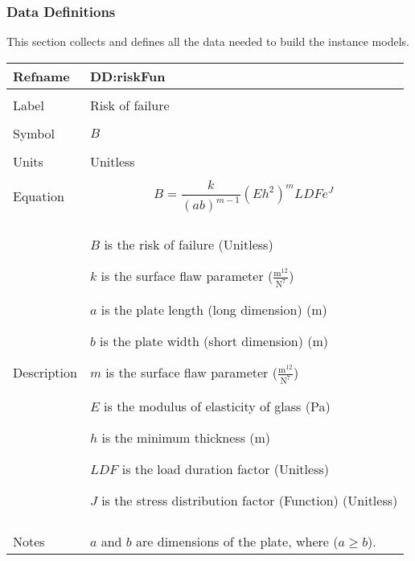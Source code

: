 \documentclass[12pt]{article}
\begin{document}
\subsubsection{Data Definitions}
\label{Sec:DDs}
This section collects and defines all the data needed to build the instance models.

\vspace{\baselineskip}
\noindent
\begin{minipage}{\textwidth}
\begin{tabular}{>{\raggedright}p{}>{\raggedright\arraybackslash}p{}}
\toprule \textbf{Refname} & \textbf{DD:riskFun}
\label{DD:riskFun}
\\ \midrule \\
Label & Risk of failure
        
\\ \midrule \\
Symbol & $B$
         
\\ \midrule \\
Units & Unitless
        
\\ \midrule \\
Equation & \begin{displaymath}
           B=\frac{k}{\left(a b\right)^{m-1}} \left(E h^{2}\right)^{m} LDF e^{J}
           \end{displaymath}
\\ \midrule \\
Description & \begin{symbDescription}
              \item{$B$ is the risk of failure (Unitless)}
              \item{$k$ is the surface flaw parameter ($\frac{\text{m}^{12}}{\text{N}^{7}}$)}
              \item{$a$ is the plate length (long dimension) (m)}
              \item{$b$ is the plate width (short dimension) (m)}
              \item{$m$ is the surface flaw parameter ($\frac{\text{m}^{12}}{\text{N}^{7}}$)}
              \item{$E$ is the modulus of elasticity of glass (Pa)}
              \item{$h$ is the minimum thickness (m)}
              \item{$LDF$ is the load duration factor (Unitless)}
              \item{$J$ is the stress distribution factor (Function) (Unitless)}
              \end{symbDescription}
\\ \midrule \\
Notes & $a$ and $b$ are dimensions of the plate, where ($a\geq{}b$).
        

\end{tabular}
\end{minipage}
\end{document}
